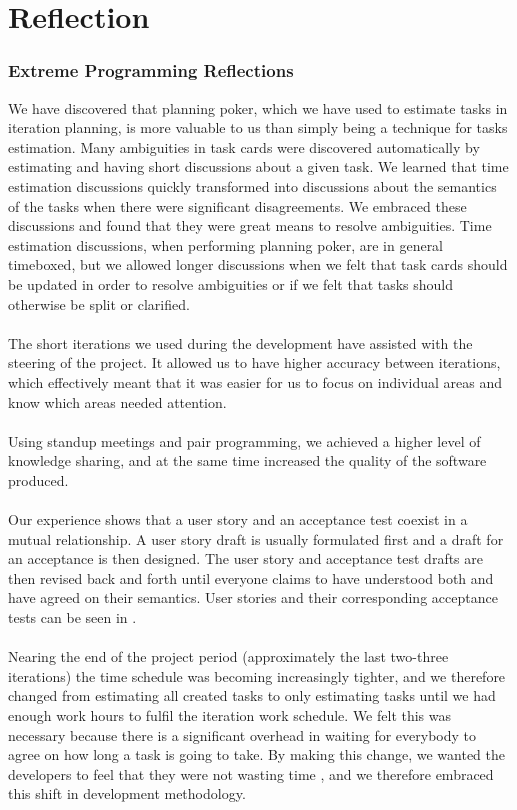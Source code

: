 
\chapter{Reflection}
\label{cha:reflection}

\subsection{Extreme Programming Reflections}
We have discovered that planning poker, which we have used to estimate tasks in iteration planning, is more valuable to us than simply being a technique for tasks estimation. Many ambiguities in task cards were discovered automatically by estimating and having short discussions about a given task. We learned that time estimation discussions quickly transformed into discussions about the semantics of the tasks when there were significant disagreements. We embraced these discussions and found that they were great means to resolve ambiguities. Time estimation discussions, when performing planning poker, are in general timeboxed, but we allowed longer discussions when we felt that task cards should be updated in order to resolve ambiguities or if we felt that tasks should otherwise be split or clarified.
\\\\
The short iterations we used during the development have assisted with the steering of the project. It allowed us to have higher accuracy between iterations, which effectively meant that it was easier for us to focus on individual areas and know which areas needed attention. 
\\\\
Using standup meetings and pair programming, we achieved a higher level of knowledge sharing, and at the same time increased the quality of the software produced. 
\\\\
Our experience shows that a user story and an acceptance test coexist in a mutual relationship. A user story draft is usually formulated first and a draft for an acceptance is then designed. The user story and acceptance test drafts are then revised back and forth until everyone claims to have understood both and have agreed on their semantics. User stories and their corresponding acceptance tests can be seen in .
\\\\
Nearing the end of the project period (approximately the last two-three iterations) the time schedule was becoming increasingly tighter, and we therefore changed from estimating all created tasks to only estimating tasks until we had enough work hours to fulfil the iteration work schedule. We felt this was necessary because there is a significant overhead in waiting for everybody to agree on how long a task is going to take. By making this change, we wanted the developers to feel that they were not wasting time , and we therefore embraced this shift in development methodology.

